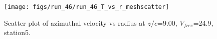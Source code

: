 \begin{figure}[H]
\centering
\texttt{[image: figs/run\_46/run\_46\_T\_vs\_r\_meshscatter]}
\caption{Scatter plot of azimuthal velocity vs radius at $z/c$=9.00, $V_{free}$=24.9, station5.}
\end{figure}


